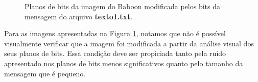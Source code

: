 \documentclass{article}
\begin{document}
\begin{figure}[htp]
	\qquad
	\qquad

	\caption{Planos de bits da imagem do Baboon modificada pelos bits da mensagem do arquivo \textbf{texto1.txt}.}%
	\label{fig:imagem:plano:baboon}%
\end{figure}	

Para as imagens apresentadas na Figura \ref{fig:imagem:plano:baboon}, notamos que não é possível visualmente verificar que a imagem foi modificada a partir da análise visual dos seus planos de bits. Essa condição deve ser propiciada tanto pela ruído apresentado nos planos de bits menos significativos quanto pelo tamanho da mensagem que é pequeno. 
\end{document}
